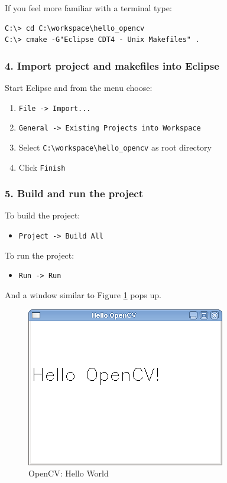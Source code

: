If you feel more familiar with a terminal type:

\begin{lstlisting}
C:\> cd C:\workspace\hello_opencv
C:\> cmake -G"Eclipse CDT4 - Unix Makefiles" .
\end{lstlisting}

\subsubsection*{4. Import project and makefiles into Eclipse}
Start Eclipse and from the menu choose:
\begin{enumerate}
 \item \verb|File -> Import...|
 \item \verb|General -> Existing Projects into Workspace|
 \item Select \verb|C:\workspace\hello_opencv| as root directory
 \item Click \verb|Finish|
\end{enumerate}

\subsubsection*{5. Build and run the project}
To build the project:
 \begin{itemize}
  \item \verb|Project -> Build All|
 \end{itemize}
To run the project:
\begin{itemize}
 \item \verb|Run -> Run|
\end{itemize}

And a window similar to Figure \ref{fig:helloworld} pops up.

\begin{figure}[ht!]
\label{fig:helloworld}
\caption{OpenCV: Hello World}
 \begin{center}
   \includegraphics[scale=0.5]{img/helloopencv.png}
 \end{center}
\end{figure}